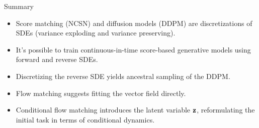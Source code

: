 \documentclass{beamer}
\begin{document}
\begin{frame}{Summary}
	\begin{itemize}
		\item Score matching (NCSN) and diffusion models (DDPM) are discretizations of SDEs (variance exploding and variance preserving).
		\vfill
		\item It's possible to train continuous-in-time score-based generative models using forward and reverse SDEs.
		\vfill
		\item Discretizing the reverse SDE yields ancestral sampling of the DDPM.
		\vfill
		\item Flow matching suggests fitting the vector field directly.
		\vfill 
		\item Conditional flow matching introduces the latent variable $\mathbf{z}$, reformulating the initial task in terms of conditional dynamics.
	\end{itemize}
\end{frame}
\end{document}
